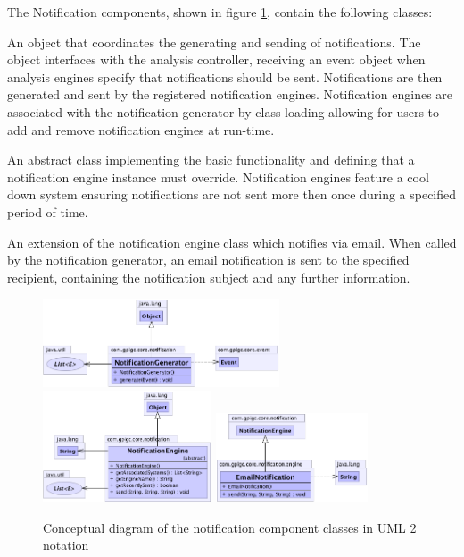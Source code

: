 \documentclass[10pt,a4paper]{article}
\begin{document}
The Notification components, shown in figure \ref{fig:notificationComponent}, 
contain the following classes:
\begin{description}[leftmargin=1cm,labelindent=1cm]
  \item [NotificationGenerator] An object that coordinates the generating and
    sending of notifications. The object interfaces with the analysis
    controller, receiving an event object when analysis engines specify that
    notifications should be sent. Notifications are then generated and sent by
    the registered notification engines. Notification engines are associated with
    the notification generator by class loading allowing for users to add and
    remove notification engines at run-time.
  \vspace{0.2cm}
  \item [NotificationEngine] An abstract class implementing the basic
    functionality and defining that a notification engine instance must
    override. Notification engines feature a cool down system ensuring 
    notifications are not sent more then once during a specified period of 
    time.
  \vspace{0.2cm}
  \item [EmailNotification] An extension of the notification engine
    class which notifies via email. When called by the notification
    generator, an email notification is sent to the specified recipient, 
    containing the notification subject and any further information.
\end{description}
 
\begin{figure}[h!]
  \centering
  \includegraphics[width= 7cm]{images/Notification/NotificationGenerator.png}
  \includegraphics[width= 5cm]{images/Notification/NotificationEngine.png}
  \includegraphics[width= 4.5cm]{images/Notification/EmailNotification.png}
  \caption{Conceptual diagram of the notification component classes in
UML 2 notation}
  \label{fig:notificationComponent}
\end{figure}
\end{document}

